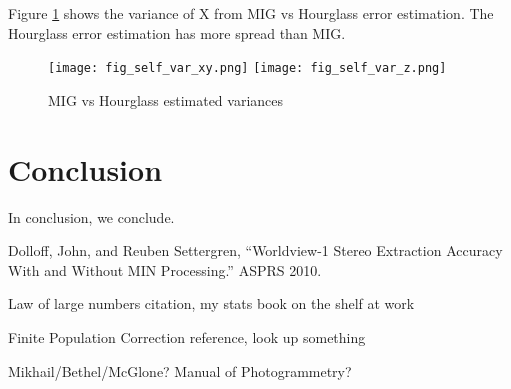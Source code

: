 \documentclass{amsart}
\begin{document}
Figure \ref{fig:mig_vs_hourglass_var} shows the variance of X from MIG vs
Hourglass error estimation. The Hourglass error estimation has more spread than MIG.

\begin{figure}
\texttt{[image: fig\_self\_var\_xy.png]}
\texttt{[image: fig\_self\_var\_z.png]}
\caption{\label{fig:mig_vs_hourglass_var}MIG vs Hourglass estimated variances}
\end{figure}

\section{Conclusion}
In conclusion, we conclude.





\begin{thebibliography}{9} %

Dolloff, John, and Reuben Settergren, ``Worldview-1 Stereo
  Extraction Accuracy With and Without MIN Processing.'' ASPRS 2010.

Law of large numbers citation, my stats book on the shelf at work

Finite Population Correction reference, look up something

Mikhail/Bethel/McGlone? Manual of Photogrammetry?

\end{thebibliography}
 
\end{document}
